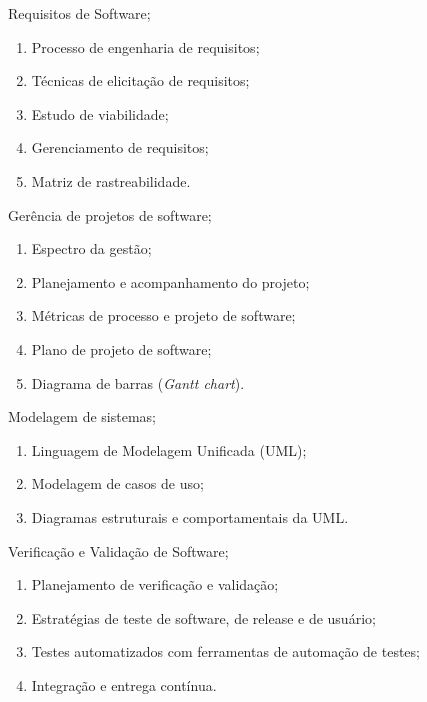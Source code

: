 \begin{pud}
\begin{description}[itemsep=0em]
        \item[UNIDADE II:] Requisitos de Software;
	         \begin{enumerate}[itemsep=0em, topsep=0em]
				\item Processo de engenharia de requisitos;
			    \item Técnicas de elicitação de requisitos; %
			    \item Estudo de viabilidade;
			    \item Gerenciamento de requisitos;
			    \item Matriz de rastreabilidade.
            \end{enumerate}
            
         \item[UNIDADE III:] Gerência de projetos de software;
	         \begin{enumerate}[itemsep=0em, topsep=0em]
				\item Espectro da gestão;
				\item Planejamento e acompanhamento do projeto;
				\item Métricas de processo e projeto de software;
				\item Plano de projeto de software;
				\item Diagrama de barras (\textit{Gantt chart}).        
            \end{enumerate}
            
         \item[UNIDADE IV:]  Modelagem de sistemas;
	         \begin{enumerate}[itemsep=0em, topsep=0em]
				\item Linguagem de Modelagem Unificada (UML);
				\item Modelagem de casos de uso;
				\item Diagramas estruturais e comportamentais da UML.
            \end{enumerate}

         \item[UNIDADE V:] Verificação e Validação de Software;
	         \begin{enumerate}[itemsep=0em, topsep=0em]
				\item Planejamento de verificação e validação;
				\item Estratégias de teste de software, de release e de usuário;
				\item Testes automatizados com ferramentas de automação de testes;
				\item  Integração e entrega contínua.      
            \end{enumerate}
            

\end{description}
\end{pud}
